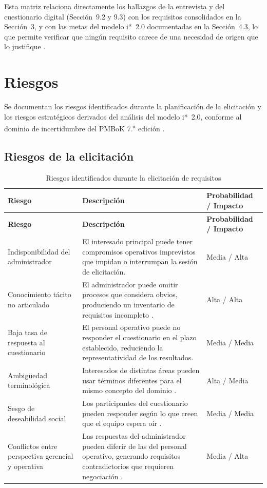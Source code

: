 \documentclass[12pt,a4paper]{article}
\begin{document}
Esta matriz relaciona directamente los hallazgos de la entrevista y del
cuestionario digital (Sección~9.2 y 9.3) con los requisitos consolidados en la
Sección~3, y con las metas del modelo i*~2.0 documentadas en la Sección~4.3, lo
que permite verificar que ningún requisito carece de una necesidad de origen
que lo justifique \cite{ISO29148:2018}.

\section{Riesgos}

Se documentan los riesgos identificados durante la planificación de la
elicitación y los riesgos estratégicos derivados del análisis del modelo
i*~2.0, conforme al dominio de incertidumbre del PMBoK 7.\textsuperscript{a}
edición \cite{PMI2021,Robertson2012}.

\subsection{Riesgos de la elicitación}

\begin{longtable}{|p{4.4cm}|p{6.0cm}|p{2.8cm}|}
\caption{Riesgos identificados durante la elicitación de requisitos} \\
\hline
\textbf{Riesgo} & \textbf{Descripción} & \textbf{Probabilidad / Impacto} \\
\hline
\endfirsthead
\hline
\textbf{Riesgo} & \textbf{Descripción} & \textbf{Probabilidad / Impacto} \\
\hline
\endhead
Indisponibilidad del administrador & El interesado principal puede tener
compromisos operativos imprevistos que impidan o interrumpan la sesión de
elicitación. & Media / Alta \\ \hline
Conocimiento tácito no articulado & El administrador puede omitir procesos que
considera obvios, produciendo un inventario de requisitos incompleto
\cite{Pohl2010}. & Alta / Alta \\ \hline
Baja tasa de respuesta al cuestionario & El personal operativo puede no
responder el cuestionario en el plazo establecido, reduciendo la
representatividad de los resultados. & Media / Media \\ \hline
Ambigüedad terminológica & Interesados de distintas áreas pueden usar términos
diferentes para el mismo concepto del dominio \cite{IREB2023}. & Alta / Media \\ \hline
Sesgo de deseabilidad social & Los participantes del cuestionario pueden
responder según lo que creen que el equipo espera oír \cite{Pacheco2018}. & Media / Media \\ \hline
Conflictos entre perspectiva gerencial y operativa & Las respuestas del
administrador pueden diferir de las del personal operativo, generando
requisitos contradictorios que requieren negociación \cite{Pohl2010,Robertson2012}. & Media / Alta \\ \hline
\end{longtable}
\end{document}
